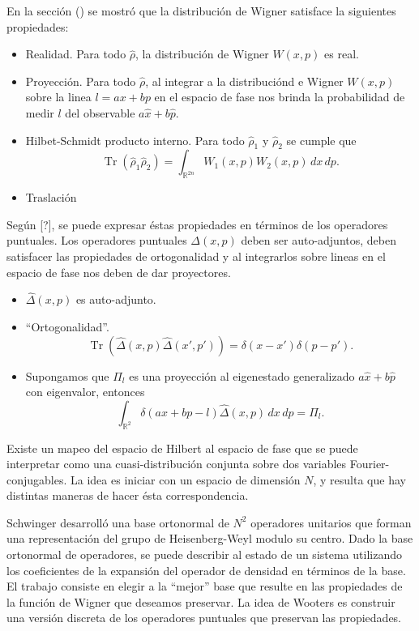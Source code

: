 \documentclass[a4paper]{report}
\DeclareMathOperator{\R}{\mathbb{R}}
\DeclareMathOperator{\Tr}{Tr}
\begin{document}
  En la sección () se mostró que la distribución de Wigner
  satisface la siguientes propiedades:
  \begin{itemize}
    \item Realidad. Para todo $\hat{\rho}$, la distribución
      de Wigner $W(x,p)$ es real.
    \item Proyección. Para todo $\hat{\rho}$, al integrar a
      la distribuciónd e Wigner $W(x,p)$ sobre la linea $l =
      ax + bp$ en el espacio de fase nos brinda la
      probabilidad de medir $l$ del observable $a \hat{x} +
      b \hat{p}$.
    \item Hilbet-Schmidt producto interno. Para todo
      $\hat{\rho}_1$  y $\hat{\rho}_2$ se cumple que
      \[
        \Tr\left(\hat{\rho}_1 \hat{\rho}_2\right)
        = \int_{\R^{2n}} W_1(x,p) W_2(x,p) \, dx \, dp.
      \] 
    \item Traslación
  \end{itemize}

  Según [?], se puede expresar éstas propiedades en términos
  de los operadores puntuales. Los operadores puntuales
  $\Delta(x,p)$ deben ser auto-adjuntos, deben satisfacer
  las propiedades de ortogonalidad y al integrarlos sobre
  lineas en el espacio de fase nos deben de dar proyectores.

  \begin{itemize}
    \item $\hat{\Delta}(x,p)$ es auto-adjunto.
    \item ``Ortogonalidad''. 
      \[
        \Tr\left( \hat{\Delta}(x,p) \hat{\Delta}(x',p')
        \right)
        = \delta(x-x')\delta(p-p').
      \] 
    \item Supongamos que $\Pi_l$ es una proyección al
      eigenestado generalizado $a \hat{x} + b \hat{p}$ con
      eigenvalor, entonces
      \[
        \int_{\R^2} \delta(ax + bp - l) \hat{\Delta}(x,p) \,
        dx \, dp
        = \Pi_l.
      \] 
  \end{itemize}

  Existe un mapeo del espacio de Hilbert al espacio de fase
  que se puede interpretar como una cuasi-distribución
  conjunta sobre dos variables Fourier-conjugables. La idea
  es iniciar con un espacio de dimensión $N$, y resulta que
  hay distintas maneras de hacer ésta correspondencia.

  Schwinger desarrolló una base ortonormal de $N^2$ 
  operadores unitarios que forman una representación del
  grupo de Heisenberg-Weyl modulo su centro. Dado la base
  ortonormal de operadores, se puede describir al estado de
  un sistema utilizando los coeficientes de la expansión del
  operador de densidad en términos de la base. El trabajo
  consiste en elegir a la ``mejor'' base que resulte en las
  propiedades de la función de Wigner que deseamos
  preservar.  La idea de Wooters es construir una versión
  discreta de los operadores puntuales que preservan las
  propiedades. 
\end{document}

